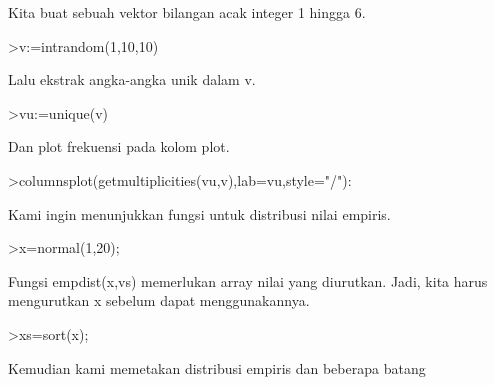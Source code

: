 \documentclass[a4paper,10pt]{article}
\begin{document}
\begin{eulernotebook}
\begin{eulercomment}
\begin{eulercomment}
\begin{eulercomment}
\begin{eulercomment}
\begin{eulercomment}
\begin{eulercomment}
\begin{eulercomment}
\begin{eulercomment}
\begin{eulercomment}
\begin{eulercomment}
\begin{eulercomment}
\begin{eulercomment}
\begin{eulercomment}
\begin{eulercomment}
\begin{eulercomment}
\begin{eulercomment}
\begin{eulercomment}
\begin{eulercomment}
\begin{eulercomment}
\begin{eulercomment}
\begin{eulercomment}
\begin{eulercomment}
\begin{eulercomment}
\begin{eulercomment}
\begin{eulercomment}
\begin{eulercomment}
\begin{eulercomment}
\begin{eulercomment}
\begin{eulercomment}
\begin{eulercomment}
\begin{eulercomment}
\begin{eulercomment}
\begin{eulercomment}
Kita buat sebuah vektor bilangan acak integer 1 hingga 6.
\end{eulercomment}
\begin{eulerprompt}
>v:=intrandom(1,10,10)
\end{eulerprompt}
\begin{euleroutput}
  [5,  1,  8,  6,  6,  10,  9,  6,  8,  3]
\end{euleroutput}
\begin{eulercomment}
Lalu ekstrak angka-angka unik dalam v.
\end{eulercomment}
\begin{eulerprompt}
>vu:=unique(v)
\end{eulerprompt}
\begin{euleroutput}
  [1,  3,  5,  6,  8,  9,  10]
\end{euleroutput}
\begin{eulercomment}
Dan plot frekuensi pada kolom plot.
\end{eulercomment}
\begin{eulerprompt}
>columnsplot(getmultiplicities(vu,v),lab=vu,style="/"):
\end{eulerprompt}
\begin{eulercomment}
Kami ingin menunjukkan fungsi untuk distribusi nilai empiris.
\end{eulercomment}
\begin{eulerprompt}
>x=normal(1,20);
\end{eulerprompt}
\begin{eulercomment}
Fungsi empdist(x,vs) memerlukan array nilai yang diurutkan. Jadi, kita
harus mengurutkan x sebelum dapat menggunakannya.
\end{eulercomment}
\begin{eulerprompt}
>xs=sort(x);
\end{eulerprompt}
\begin{eulercomment}
Kemudian kami memetakan distribusi empiris dan beberapa batang

\end{eulercomment}
\end{eulercomment}
\end{eulercomment}
\end{eulercomment}
\end{eulercomment}
\end{eulercomment}
\end{eulercomment}
\end{eulercomment}
\end{eulercomment}
\end{eulercomment}
\end{eulercomment}
\end{eulercomment}
\end{eulercomment}
\end{eulercomment}
\end{eulercomment}
\end{eulercomment}
\end{eulercomment}
\end{eulercomment}
\end{eulercomment}
\end{eulercomment}
\end{eulercomment}
\end{eulercomment}
\end{eulercomment}
\end{eulercomment}
\end{eulercomment}
\end{eulercomment}
\end{eulercomment}
\end{eulercomment}
\end{eulercomment}
\end{eulercomment}
\end{eulercomment}
\end{eulercomment}
\end{eulercomment}
\end{eulernotebook}
\end{document}
